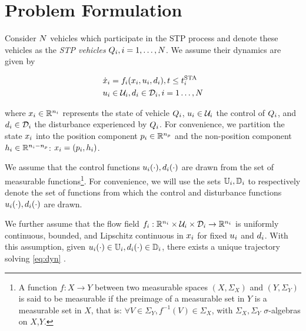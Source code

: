 \section{Problem Formulation \label{sec:formulation}}
Consider $N$ vehicles which participate in the STP process and denote these vehicles as the \textit{STP vehicles} $Q_i, i = 1, \ldots, N$. We assume their dynamics are given by

\begin{equation}
\label{eq:dyn}
\begin{aligned}
\dot\state_i &= \fdyn_i(\state_i, \ctrl_i, \dstb_i), t \le \sta_i \\
\ctrl_i &\in \cset_i, \dstb_i \in \dset_i, i = 1 \ldots, \N
\end{aligned}
\end{equation}

\noindent where $x_i \in \mathbb{R}^{n_i}$ represents the state of vehicle $Q_i$, $u_i \in \mathcal{U}_i$ the control of $Q_i$, and $d_i \in \mathcal{D}_i$ the disturbance experienced by $Q_i$. For convenience, we partition the state $x_i$ into the position component $p_i \in \mathbb{R}^{n_p}$ and the non-position component $h_i \in \mathbb{R}^{n_i - n_p}$: $x_i = (p_i, h_i)$.

We assume that the control functions $u_i(\cdot), d_i(\cdot)$ are drawn from the set of measurable functions\footnote{A function $f:X\to Y$ between two measurable spaces $(X,\Sigma_X)$ and $(Y,\Sigma_Y)$ is said to be measurable if the preimage of a measurable set in $Y$ is a measurable set in $X$, that is: $\forall V\in\Sigma_Y, f^{-1}(V)\in\Sigma_X$, with $\Sigma_X,\Sigma_Y$ $\sigma$-algebras on $X$,$Y$.}. For convenience, we will use the sets $\mathbb{U}_i, \mathbb{D}_i$ to respectively denote the set of functions from which the control and disturbance functions $u_i(\cdot), d_i(\cdot)$ are drawn.

We further assume that the flow field $f_i: \mathbb{R}^{n_i}\times\mathcal{U}_i\times\mathcal{D}_i \rightarrow \mathbb{R}^{n_i}$ is uniformly continuous, bounded, and Lipschitz continuous in $x_i$ for fixed $u_i$ and $d_i$. With this assumption, given $u_i(\cdot) \in \mathbb{U}_i, d_i(\cdot) \in \mathbb{D}_i$, there exists a unique trajectory solving \eqref{eq:dyn} \cite{EarlA.Coddington1955}. %

